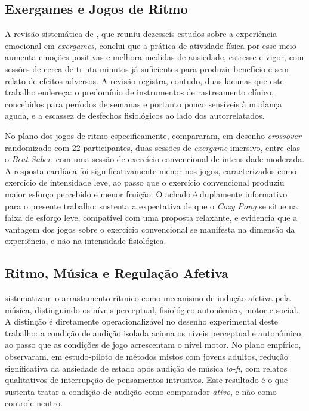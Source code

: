 \subsection{Exergames e Jogos de Ritmo}\label{subsec:rel-exergames}

A revisão sistemática de \citet{Marques2023}, que reuniu dezesseis estudos sobre a experiência emocional em \textit{exergames}, conclui que a prática de atividade física por esse meio aumenta emoções positivas e melhora medidas de ansiedade, estresse e vigor, com sessões de cerca de trinta minutos já suficientes para produzir benefício e sem relato de efeitos adversos. A revisão registra, contudo, duas lacunas que este trabalho endereça: o predomínio de instrumentos de rastreamento clínico, concebidos para períodos de semanas e portanto pouco sensíveis à mudança aguda, e a escassez de desfechos fisiológicos ao lado dos autorrelatados.

No plano dos jogos de ritmo especificamente, \citet{RubioArias2024} compararam, em desenho \textit{crossover} randomizado com $22$ participantes, duas sessões de \textit{exergame} imersivo, entre elas o \textit{Beat Saber}, com uma sessão de exercício convencional de intensidade moderada. A resposta cardíaca foi significativamente menor nos jogos, caracterizados como exercício de intensidade leve, ao passo que o exercício convencional produziu maior esforço percebido e menor fruição. O achado é duplamente informativo para o presente trabalho: sustenta a expectativa de que o \textit{Cozy Pong} se situe na faixa de esforço leve, compatível com uma proposta relaxante, e evidencia que a vantagem dos jogos sobre o exercício convencional se manifesta na dimensão da experiência, e não na intensidade fisiológica.

\subsection{Ritmo, Música e Regulação Afetiva}\label{subsec:rel-ritmo}

\citet{Trost2017} sistematizam o arrastamento rítmico como mecanismo de indução afetiva pela música, distinguindo os níveis perceptual, fisiológico autonômico, motor e social. A distinção é diretamente operacionalizável no desenho experimental deste trabalho: a condição de audição isolada aciona os níveis perceptual e autonômico, ao passo que as condições de jogo acrescentam o nível motor. No plano empírico, \citet{Dsouza2024} observaram, em estudo-piloto de métodos mistos com jovens adultos, redução significativa da ansiedade de estado após audição de música \textit{lo-fi}, com relatos qualitativos de interrupção de pensamentos intrusivos. Esse resultado é o que sustenta tratar a condição de audição como comparador \emph{ativo}, e não como controle neutro.

